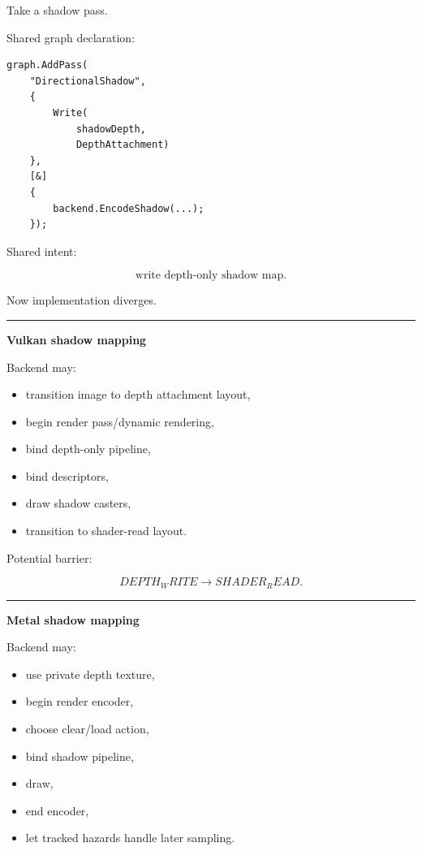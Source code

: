 Take a shadow pass.

Shared graph declaration:

\begin{verbatim}
graph.AddPass(
    "DirectionalShadow",
    {
        Write(
            shadowDepth,
            DepthAttachment)
    },
    [&]
    {
        backend.EncodeShadow(...);
    });
\end{verbatim}

Shared intent:

\[
\boxed{
\text{write depth-only shadow map}.
}
\]

Now implementation diverges.

\begin{center}\rule{0.5\linewidth}{0.5pt}\end{center}

\textbf{Vulkan shadow mapping}

Backend may:

\begin{itemize}
\tightlist
\item
  transition image to depth attachment layout,
\item
  begin render pass/dynamic rendering,
\item
  bind depth-only pipeline,
\item
  bind descriptors,
\item
  draw shadow casters,
\item
  transition to shader-read layout.
\end{itemize}

Potential barrier:

\[
DEPTH_WRITE
\rightarrow
SHADER_READ.
\]

\begin{center}\rule{0.5\linewidth}{0.5pt}\end{center}

\textbf{Metal shadow mapping}

Backend may:

\begin{itemize}
\tightlist
\item
  use private depth texture,
\item
  begin render encoder,
\item
  choose clear/load action,
\item
  bind shadow pipeline,
\item
  draw,
\item
  end encoder,
\item
  let tracked hazards handle later sampling.
\end{itemize}

